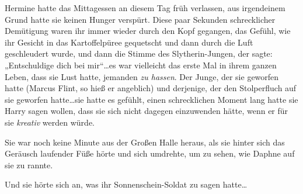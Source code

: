 Hermine hatte das Mittagessen an diesem Tag früh verlassen, aus irgendeinem Grund hatte sie keinen Hunger verspürt. Diese paar Sekunden schrecklicher Demütigung waren ihr immer wieder durch den Kopf gegangen, das Gefühl, wie ihr Gesicht in das Kartoffelpüree gequetscht und dann durch die Luft geschleudert wurde, und dann die Stimme des Slytherin-Jungen, der sagte: „Entschuldige dich bei mir“…es war vielleicht das erste Mal in ihrem ganzen Leben, dass sie Lust hatte, jemanden \emph{zu hassen}. Der Junge, der sie geworfen hatte (Marcus Flint, so hieß er angeblich) und derjenige, der den Stolperfluch auf sie geworfen hatte…sie hatte es gefühlt, einen schrecklichen Moment lang hatte sie Harry sagen wollen, dass sie sich nicht dagegen einzuwenden hätte, wenn er für sie \emph{kreativ} werden würde.

Sie war noch keine Minute aus der Großen Halle heraus, als sie hinter sich das Geräusch laufender Füße hörte und sich umdrehte, um zu sehen, wie Daphne auf sie zu rannte.

Und sie hörte sich an, was ihr Sonnenschein-Soldat zu sagen hatte…


